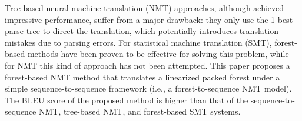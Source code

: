 Tree-based neural machine translation (NMT) approaches, although achieved impressive performance, suffer from a major drawback: they only use the 1-best parse tree to direct the translation, which potentially introduces translation mistakes due to parsing errors. For statistical machine translation (SMT), forest-based methods have been proven to be effective for solving this problem, while for NMT this kind of approach has not been attempted. This paper proposes a forest-based NMT method that translates a linearized packed forest under a simple sequence-to-sequence framework (i.e., a forest-to-sequence NMT model). The BLEU score of the proposed method is higher than that of the sequence-to-sequence NMT, tree-based NMT, and forest-based SMT systems.
